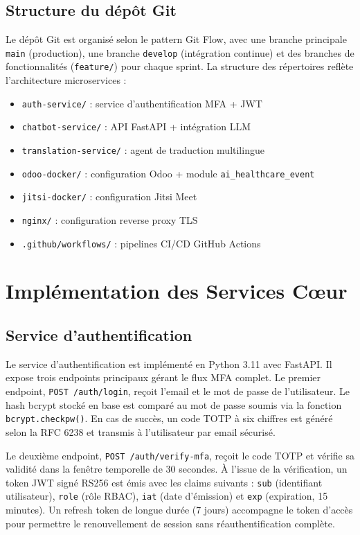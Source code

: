 \subsection{Structure du dépôt Git}
Le dépôt Git est organisé selon le pattern Git Flow, avec une branche principale \texttt{main} (production), une branche \texttt{develop} (intégration continue) et des branches de fonctionnalités (\texttt{feature/}) pour chaque sprint. La structure des répertoires reflète l'architecture microservices :

\begin{itemize}
    \item \texttt{auth-service/} : service d'authentification MFA + JWT
    \item \texttt{chatbot-service/} : API FastAPI + intégration LLM
    \item \texttt{translation-service/} : agent de traduction multilingue
    \item \texttt{odoo-docker/} : configuration Odoo + module \texttt{ai\_healthcare\_event}
    \item \texttt{jitsi-docker/} : configuration Jitsi Meet
    \item \texttt{nginx/} : configuration reverse proxy TLS
    \item \texttt{.github/workflows/} : pipelines CI/CD GitHub Actions
\end{itemize}

\section{Implémentation des Services C\oe{}ur}

\subsection{Service d'authentification}
Le service d'authentification est implémenté en Python 3.11 avec FastAPI. Il expose trois endpoints principaux gérant le flux MFA complet. Le premier endpoint, \texttt{POST /auth/login}, reçoit l'email et le mot de passe de l'utilisateur. Le hash bcrypt stocké en base est comparé au mot de passe soumis via la fonction \texttt{bcrypt.checkpw()}. En cas de succès, un code TOTP à six chiffres est généré selon la RFC 6238 et transmis à l'utilisateur par email sécurisé.

Le deuxième endpoint, \texttt{POST /auth/verify-mfa}, reçoit le code TOTP et vérifie sa validité dans la fenêtre temporelle de 30 secondes. À l'issue de la vérification, un token JWT signé RS256 est émis avec les claims suivants : \texttt{sub} (identifiant utilisateur), \texttt{role} (rôle RBAC), \texttt{iat} (date d'émission) et \texttt{exp} (expiration, 15 minutes). Un refresh token de longue durée (7 jours) accompagne le token d'accès pour permettre le renouvellement de session sans réauthentification complète.

